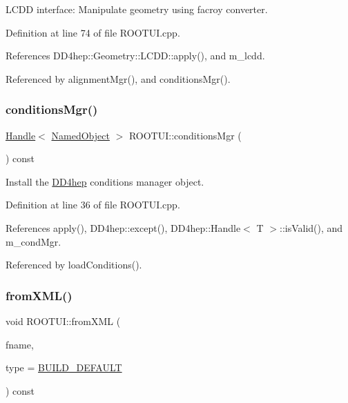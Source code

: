 L\+C\+DD interface\+: Manipulate geometry using facroy converter. 



Definition at line 74 of file R\+O\+O\+T\+U\+I.\+cpp.



References D\+D4hep\+::\+Geometry\+::\+L\+C\+D\+D\+::apply(), and m\+\_\+lcdd.



Referenced by alignment\+Mgr(), and conditions\+Mgr().

\hypertarget{class_d_d4hep_1_1_r_o_o_t_u_i_ae0abcc8009f3466d0d42a442a25016e2}{}\label{class_d_d4hep_1_1_r_o_o_t_u_i_ae0abcc8009f3466d0d42a442a25016e2} 
\subsubsection{\texorpdfstring{conditions\+Mgr()}{conditionsMgr()}}
{\footnotesize\ttfamily \hyperlink{class_d_d4hep_1_1_handle}{Handle}$<$ \hyperlink{class_d_d4hep_1_1_named_object}{Named\+Object} $>$ R\+O\+O\+T\+U\+I\+::conditions\+Mgr (\begin{DoxyParamCaption}{ }\end{DoxyParamCaption}) const}



Install the \hyperlink{namespace_d_d4hep}{D\+D4hep} conditions manager object. 



Definition at line 36 of file R\+O\+O\+T\+U\+I.\+cpp.



References apply(), D\+D4hep\+::except(), D\+D4hep\+::\+Handle$<$ T $>$\+::is\+Valid(), and m\+\_\+cond\+Mgr.



Referenced by load\+Conditions().

\hypertarget{class_d_d4hep_1_1_r_o_o_t_u_i_a728864d0e13750c4ea3bf88415559317}{}\label{class_d_d4hep_1_1_r_o_o_t_u_i_a728864d0e13750c4ea3bf88415559317} 
\subsubsection{\texorpdfstring{from\+X\+M\+L()}{fromXML()}}
{\footnotesize\ttfamily void R\+O\+O\+T\+U\+I\+::from\+X\+ML (\begin{DoxyParamCaption}\item[{const std\+::string \&}]{fname,  }\item[{\hyperlink{namespace_d_d4hep_acafe43ba4537ab6e999e808142965fab}{L\+C\+D\+D\+Build\+Type}}]{type = {\ttfamily \hyperlink{namespace_d_d4hep_acafe43ba4537ab6e999e808142965fabaceac720f961afd2369fcc9f343113a2e}{B\+U\+I\+L\+D\+\_\+\+D\+E\+F\+A\+U\+LT}} }\end{DoxyParamCaption}) const\hspace{0.3cm}{\ttfamily [virtual]}}



